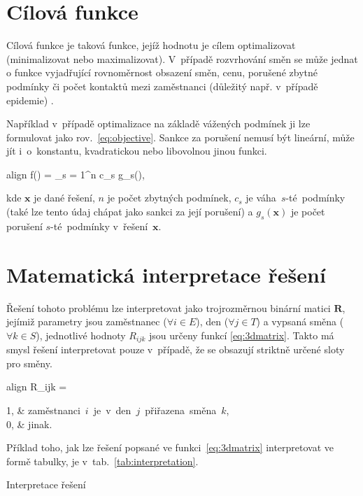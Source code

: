 \documentclass[twoside]{ctuthesis}
\newcommand{\coloredeq}[2]{\begin{empheq}[box=\colorbox{Gray}]{align}\label{#1}\hspace{1em}#2\hspace{1em}\end{empheq}}
\begin{document}
\section{Cílová funkce}
\label{sec:objective}
Cílová funkce je taková funkce, jejíž hodnotu je cílem optimalizovat (minimalizovat nebo maximalizovat). V~případě rozvrhování směn se může jednat o funkce vyjadřující rovnoměrnost obsazení směn, cenu, porušené zbytné podmínky \cite{blochliger2004modeling} či počet kontaktů mezi zaměstnanci (důležitý např. v~případě epidemie) \cite{zucchi2020personnel}.

Například v~případě optimalizace na základě vážených podmínek ji lze formulovat jako rov.~\ref{eq:objective}. Sankce za porušení nemusí být lineární, může jít i~o~konstantu, kvadratickou nebo libovolnou jinou funkci. \cite{kletzander2020solving}
\coloredeq{eq:objective}{
	f() = \sum_{s = 1}^n c_s \cdot g_s(\boldsymbol{x}),
}
kde $\boldsymbol{x}$ je dané řešení, $n$ je počet zbytných podmínek, $c_s$ je váha~$s$-té~podmínky (také lze tento údaj chápat jako sankci za její porušení) a $g_s(\boldsymbol{x})$ je počet porušení $s$-té~podmínky v~řešení~$\boldsymbol{x}$. \cite{awadallah2015hybrid}

\section{Matematická interpretace řešení}
Řešení tohoto problému lze interpretovat jako trojrozměrnou binární matici $\boldsymbol{R}$, jejímiž parametry jsou zaměstnanec ($\forall i \in E$), den ($\forall j \in T$) a vypsaná směna ($\forall k \in S$), jednotlivé hodnoty $R_{ijk}$ jsou určeny funkcí \ref{eq:3dmatrix}. \cite{vaclavik2016roster} Takto má smysl řešení interpretovat pouze v~případě, že se obsazují striktně určené sloty pro směny.

\coloredeq{eq:3dmatrix}{
	R_{ijk} =
	\begin{cases}
		1, & \mbox{zaměstnanci $i$ je v den $j$ přiřazena směna $k$,} \\
		0, & \mbox{jinak.}\\
	\end{cases}
}


Příklad toho, jak lze řešení popsané ve funkci~\ref{eq:3dmatrix} interpretovat ve formě tabulky, je v~tab.~\ref{tab:interpretation}.
\begin{table}[h]
	
	\caption{Interpretace řešení}
	\label{tab:interpretation}
\end{table}
\end{document}

